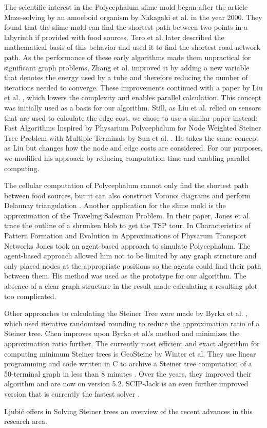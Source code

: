 The scientific interest in the Polycephalum slime mold began after the article Maze-solving by an amoeboid organism by Nakagaki et al. \cite{nakagaki_maze-solving_2000, nakagaki_path_2001} in the year 2000. They found that the slime mold can find the shortest path between two points in a labyrinth if provided with food sources. Tero et al. \cite{tero_physarum_2006} later described the mathematical basis of this behavior and used it to find the shortest road-network path. As the performance of these early algorithms made them unpractical for significant graph problems, Zhang et al. \cite{zhang_improved_2014} improved it by adding a new variable that denotes the energy used by a tube and therefore reducing the number of iterations needed to converge. These improvements continued with a paper by Liu et al. \cite{liu_physarum_2015}, which lowers the complexity and enables parallel calculation. This concept was initially used as a basis for our algorithm. Still, as Liu et al. relied on sensors that are used to calculate the edge cost, we chose to use a similar paper instead: Fast Algorithms Inspired by Physarium Polycephalum for Node Weighted Steiner Tree Problem with Multiple Terminals by Sun et al. \cite{sun_fast_2016}. He takes the same concept as Liu but changes how the node and edge costs are considered. For our purposes, we modified his approach by reducing computation time and enabling parallel computing.  

The cellular computation of Polycephalum cannot only find the shortest path between food sources, but it can also construct Voronoi diagrams and perform Delaunay triangulation \cite{shirakawa_simultaneous_2009}. Another application for the slime mold is the approximation of the Traveling Salesman Problem. In their paper, Jones et al. \cite{jones_computation_2013} trace the outline of a shrunken blob to get the TSP tour. 
In Characteristics of Pattern Formation and Evolution in Approximations of Physarum Transport Networks \cite{jones_characteristics_2010} Jones took an agent-based approach to simulate Polycephalum. The agent-based approach allowed him not to be limited by any graph structure and only placed nodes at the appropriate positions so the agents could find their path between them. His method was used as the prototype for our algorithm. The absence of a clear graph structure in the result made calculating a resulting plot too complicated.  

Other approaches to calculating the Steiner Tree were made by Byrka et al. \cite{byrka_steiner_2013}, which used iterative randomized rounding to reduce the approximation ratio of a Steiner tree. Chen \cite{chen_efficient_2018} improves upon Byrka et al.'s method and minimizes the approximation ratio further. The currently most efficient and exact algorithm for computing minimum Steiner trees is GeoSteine by Winter et al. They use linear programming and code written in C to archive a Steiner tree computation of a 50-terminal graph in less than 8 minutes \cite{winter_euclidean_1997}. Over the years, they improved their algorithm and are now on version 5.2. SCIP-Jack is an even further improved version that is currently the fastest solver \cite{RehfeldtKoch2023}.

Ljubi\'{c} offers in Solving Steiner trees \cite{ljubic_solving_2021} an overview of the recent advances in this research area.

